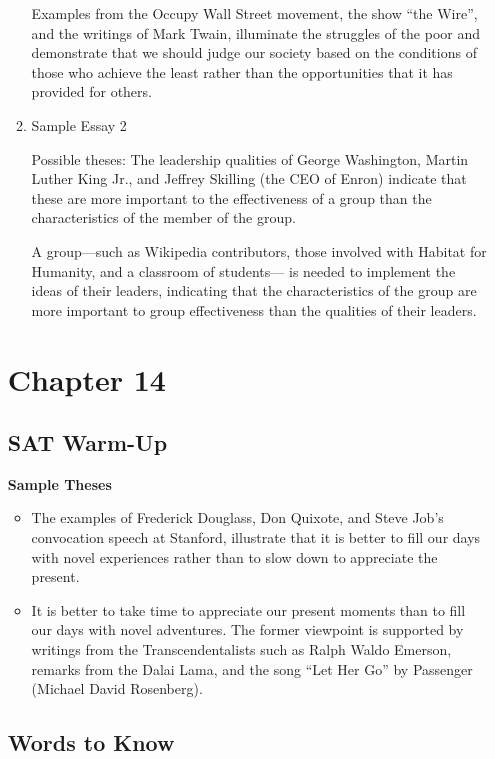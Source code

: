 \begin{enumerate}
\begin{enumerate}
\bigskip
Examples from the Occupy Wall Street movement, the show ``the Wire'', and the writings of Mark Twain, illuminate the struggles of the poor and demonstrate that we should judge our society based on the conditions of those who achieve the least rather than the opportunities that it has provided for others. 

\item Sample Essay 2

Possible theses: The leadership qualities of George Washington, Martin Luther King Jr., and Jeffrey Skilling (the CEO of Enron) indicate that these are more important to the effectiveness of a group than the characteristics of the member of the group. 

\bigskip
A group—such as Wikipedia contributors, those involved with Habitat for Humanity, and a classroom of students— is needed to implement the ideas of their leaders, indicating that the characteristics of the group are more important to group effectiveness than the qualities of their leaders. 

\end{enumerate}



\section{Chapter 14}
\subsection{SAT Warm-Up}

\textbf{Sample Theses}
\begin{itemize} 
\item The examples of Frederick Douglass, Don Quixote, and Steve Job's convocation speech at Stanford, illustrate that it is better to fill our days with novel experiences rather than to slow down to appreciate the present. 

\item It is better to take time to appreciate our present moments than to fill our days with novel adventures. The former viewpoint is supported by writings from the Transcendentalists such as Ralph Waldo Emerson, remarks from the Dalai Lama, and the song ``Let Her Go'' by Passenger (Michael David Rosenberg). 

\end{itemize}

\subsection{Words to Know}


\end{enumerate}

